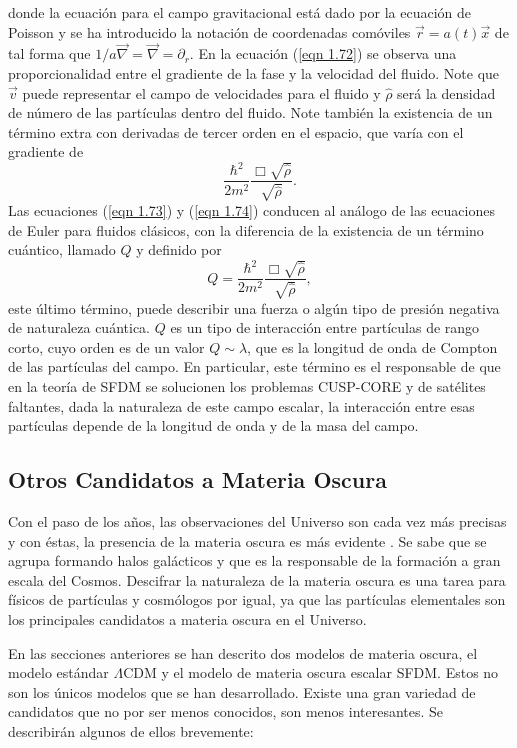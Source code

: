 \documentclass[a4paper,openright,12pt]{book}
\begin{document}
donde la ecuación para el campo gravitacional está dado por la ecuación de Poisson y se ha introducido la notación de coordenadas comóviles $\vec{r} = a(t)\vec{x}$ de tal forma que $1/a\vec{\nabla} = \vec{\nabla} = \partial_{r}$. En la ecuación (\ref{eqn 1.72}) se observa una proporcionalidad entre el gradiente de la fase y la velocidad del fluido. Note que $\vec{v}$ puede representar el campo de velocidades para el fluido y $\hat{\rho}$ será la densidad de número de las partículas dentro del fluido. Note también la existencia de un término extra con derivadas de tercer orden en el espacio, que varía con el gradiente de 
\begin{equation*}
\frac{\hbar^{2}}{2m^{2}}\frac{\Box\sqrt{\hat{\rho}}}{\sqrt{\hat{\rho}}}.
\end{equation*}
Las ecuaciones (\ref{eqn 1.73}) y (\ref{eqn 1.74}) conducen al análogo de las ecuaciones de Euler para fluidos clásicos, con la diferencia de la existencia de un término cuántico, llamado $Q$ y definido por
\begin{equation}
Q = \frac{\hbar^{2}}{2m^{2}}\frac{\Box\sqrt{\hat{\rho}}}{\sqrt{\hat{\rho}}},\label{eqn 1.78}
\end{equation}
este último término, puede describir una fuerza o algún tipo de presión negativa de naturaleza cuántica. $Q$ es un tipo de interacción entre partículas de rango corto, cuyo orden es de un valor $Q \sim \lambda$, que es la longitud de onda de Compton de las partículas del campo. En particular, este término es el responsable de que en la teoría de SFDM se solucionen los problemas CUSP-CORE y de satélites faltantes, dada la naturaleza de este campo escalar, la interacción entre esas partículas depende de la longitud de onda y de la masa del campo.
\subsection{Otros Candidatos a Materia Oscura}
Con el paso de los años, las observaciones del Universo son cada vez más precisas y con éstas, la presencia de la materia oscura es más evidente \cite{1.3.2.1}. Se sabe que se agrupa formando halos galácticos y que es la responsable de la formación a gran escala del Cosmos. Descifrar la naturaleza de la materia oscura es una tarea para físicos de partículas y cosmólogos por igual, ya que las partículas elementales son los principales candidatos a materia oscura en el Universo. 

En las secciones anteriores se han descrito dos modelos de materia oscura, el modelo estándar $\Lambda$CDM y el modelo de materia oscura escalar SFDM. Estos no son los únicos modelos que se han desarrollado. Existe una gran variedad de candidatos que no por ser menos conocidos, son menos interesantes. Se describirán algunos de ellos brevemente:
\end{document}
